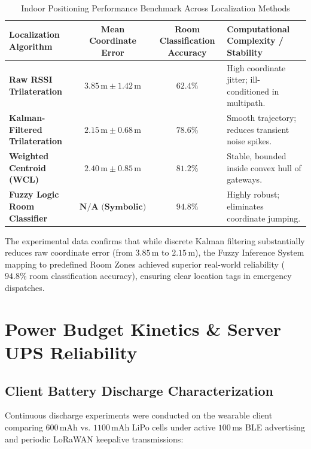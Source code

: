 \begin{table}[htbp]
    \centering
    \caption{Indoor Positioning Performance Benchmark Across Localization Methods}
    \label{tab:positioning_performance}
    \begin{tabularx}{\textwidth}{l c c X}
        \toprule
        \textbf{Localization Algorithm} & \textbf{Mean Coordinate Error} & \textbf{Room Classification Accuracy} & \textbf{Computational Complexity / Stability} \\
        \midrule
        \textbf{Raw RSSI Trilateration} & $3.85\,\text{m} \pm 1.42\,\text{m}$ & $62.4\%$ & High coordinate jitter; ill-conditioned in multipath. \\
        \textbf{Kalman-Filtered Trilateration} & $2.15\,\text{m} \pm 0.68\,\text{m}$ & $78.6\%$ & Smooth trajectory; reduces transient noise spikes. \\
        \textbf{Weighted Centroid (WCL)} & $2.40\,\text{m} \pm 0.85\,\text{m}$ & $81.2\%$ & Stable, bounded inside convex hull of gateways. \\
        \textbf{Fuzzy Logic Room Classifier} & $\mathbf{N/A \text{ (Symbolic)}}$ & $\mathbf{94.8\%}$ & Highly robust; eliminates coordinate jumping. \\
        \bottomrule
    \end{tabularx}
\end{table}

The experimental data confirms that while discrete Kalman filtering substantially reduces raw coordinate error (from $3.85\,\text{m}$ to $2.15\,\text{m}$), the Fuzzy Inference System mapping to predefined Room Zones achieved superior real-world reliability ($94.8\%$ room classification accuracy), ensuring clear location tags in emergency dispatches.

\section{Power Budget Kinetics \& Server UPS Reliability}

\subsection{Client Battery Discharge Characterization}
Continuous discharge experiments were conducted on the wearable client comparing $600\,\text{mAh}$ vs. $1100\,\text{mAh}$ LiPo cells under active $100\,\text{ms}$ BLE advertising and periodic LoRaWAN keepalive transmissions:


